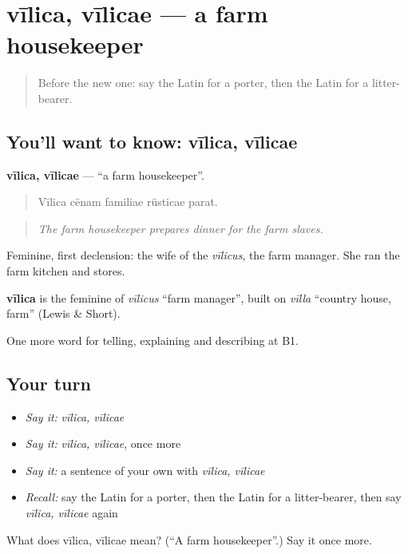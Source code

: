\section[vīlica, vīlicae]{vīlica, vīlicae — a farm housekeeper}

\label{lesson:LA-C531-vilica}



\begin{quote}
Before the new one: say the Latin for a porter, then the Latin for a litter-bearer.
\end{quote}

\subsection*{You'll want to know: vīlica, vīlicae}
\textbf{vīlica, vīlicae} — \textquotedblleft{}a farm housekeeper\textquotedblright{}.

\begin{quote}
Vīlica cēnam familiae rūsticae parat.
\end{quote}

\begin{quote}
\emph{The farm housekeeper prepares dinner for the farm slaves.}
\end{quote}

Feminine, first declension: the wife of the \emph{vīlicus}, the farm manager. She ran the farm kitchen and stores.

\begin{cousinweb}
\textbf{vīlica} is the feminine of \emph{vīlicus} \textquotedblleft{}farm manager\textquotedblright{}, built on \emph{vīlla} \textquotedblleft{}country house, farm\textquotedblright{} (Lewis \& Short).
\end{cousinweb}

\begin{grammarlens}[title={What you've built}]
One more word for telling, explaining and describing at B1.
\end{grammarlens}

\subsection*{Your turn}
\begin{itemize}
\raggedright
  \item \emph{Say it:} \emph{vīlica, vīlicae}
  \item \emph{Say it:} \emph{vīlica, vīlicae}, once more
  \item \emph{Say it:} a sentence of your own with \emph{vīlica, vīlicae}
  \item \emph{Recall:} say the Latin for a porter, then the Latin for a litter-bearer, then say \emph{vīlica, vīlicae} again
\end{itemize}

\begin{tcolorbox}[breakable,colback=teal!4,colframe=teal!35!black,title={Before you move on}]
What does vīlica, vīlicae mean? (\textquotedblleft{}A farm housekeeper\textquotedblright{}.) Say it once more.
\end{tcolorbox}
